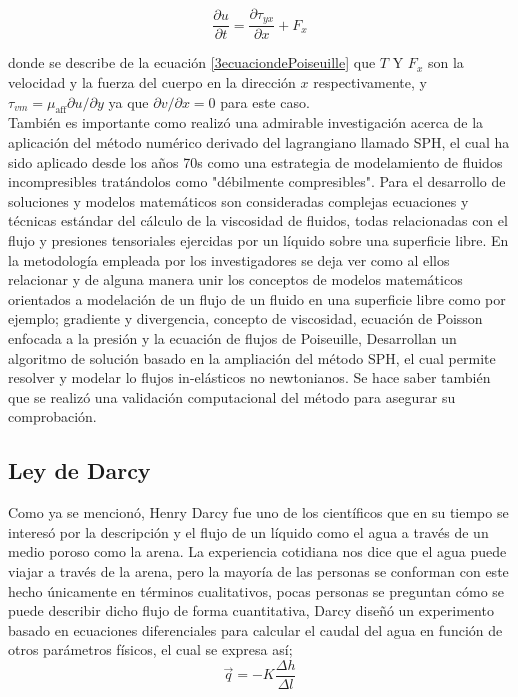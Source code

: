 \begin{equation}
	\label{3ecuaciondePoiseuille}
	\frac{\partial u}{\partial t}=\frac{\partial \tau_{y x}}{\partial x}+F_{x}
\end{equation}

donde se describe de la ecuación \eqref{3ecuaciondePoiseuille} que $T$ Y $F_{x}$ son la velocidad y la fuerza del cuerpo en la dirección $x$ respectivamente, y  $\tau_{v m}=\mu_{\mathrm{aff}} \partial u / \partial y$ ya que $\partial v / \partial x=0$ para este caso. \\

También es importante como \parencite{Xenakis2015} realizó una admirable investigación acerca de la aplicación del método numérico derivado del lagrangiano llamado SPH, el cual ha sido aplicado desde los años 70s como una estrategia de modelamiento de fluidos incompresibles tratándolos como "débilmente compresibles". Para el desarrollo de soluciones y modelos matemáticos son consideradas complejas ecuaciones y técnicas estándar del cálculo de la viscosidad de fluidos, todas relacionadas con el flujo y presiones tensoriales ejercidas por un líquido sobre una superficie libre. En la metodología empleada por los investigadores se deja ver como al ellos relacionar y de alguna manera unir los conceptos de modelos matemáticos orientados a modelación de un flujo de un fluido en una superficie libre como por ejemplo; gradiente y divergencia, concepto de viscosidad, ecuación de Poisson enfocada a la presión y la ecuación de flujos de Poiseuille, Desarrollan un algoritmo de solución basado en la ampliación del método SPH, el cual permite resolver y modelar lo flujos in-elásticos no newtonianos. Se hace saber también que se realizó una validación computacional del método para asegurar su comprobación.   





\subsection{\textbf{Ley de Darcy}}

\label{seccionleydeDarcy}

Como ya se mencionó, Henry Darcy fue uno de los científicos que en su tiempo se interesó por la descripción y el flujo de un líquido como el agua a través de un medio poroso como la arena. La experiencia cotidiana nos dice que el agua puede viajar a través de la arena, pero la mayoría de las personas se conforman con este hecho únicamente en términos cualitativos, pocas personas se preguntan cómo se puede describir dicho flujo de forma cuantitativa, Darcy diseñó un experimento basado en ecuaciones diferenciales para calcular el caudal del agua en función de otros parámetros físicos, el cual se expresa así; 
\begin{equation}
	\Vec{q}=-K\frac{\varDelta{h}}{\varDelta{l}}
	\label{Darcyeq1}
\end{equation}

